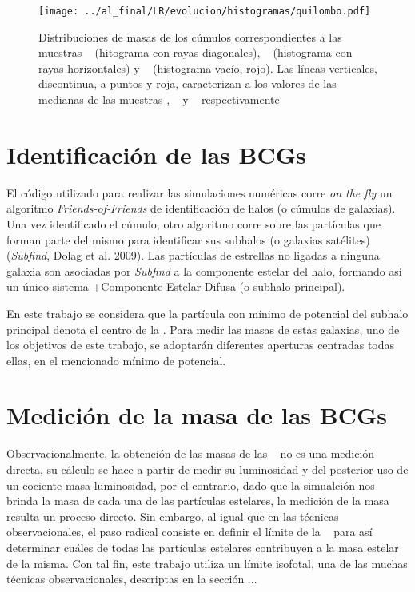 \begin{figure}[H]
 \centering
 \texttt{[image: ../al\_final/LR/evolucion/histogramas/quilombo.pdf]}
 \caption{Distribuciones de masas de los c\'umulos correspondientes a
las muestras \cmay~ (hitograma con rayas diagonales), \cmen~ (histograma con rayas horizontales) y
\aum~ (histograma vac\'io, rojo). Las l\'ineas verticales, discontinua, a puntos y roja, caracterizan a
los valores de las medianas de las muestras \cmay, \cmen~ y \aum~ respectivamente}
\label{fig:distribuciones}
\end{figure}


\section{Identificaci\'on de las BCGs}
El c\'odigo utilizado para realizar las simulaciones num\'ericas corre \textit{on the fly} un algoritmo {\it Friends-of-Friends} 
de identificaci\'on de halos (o c\'umulos de galaxias). Una vez identificado el c\'umulo, otro algoritmo corre sobre las part\'iculas que
forman parte del mismo para identificar sus subhalos (o galaxias sat\'elites) (\textit{Subfind}, Dolag et al. 2009). Las part\'iculas de estrellas no 
ligadas a ninguna galaxia son asociadas por {\it Subfind} a
la componente estelar del halo, formando as\'i un \'unico sistema \bcg+Componente-Estelar-Difusa (o subhalo principal).

En este trabajo se considera que la part\'icula con m\'inimo de potencial del subhalo principal denota el centro de la \bcg.
Para medir las masas de estas galaxias, uno de los objetivos de este trabajo,
se adoptar\'an diferentes aperturas centradas todas ellas, en el mencionado m\'inimo de potencial. 

\section{Medici\'on de la masa de las BCGs}
Observacionalmente, la obtenci\'on de las masas de las \bcgs~ no es una medici\'on directa, su c\'alculo se hace a
partir de medir su luminosidad y del posterior uso de un cociente masa-luminosidad, por el contrario, dado que la simualci\'on
nos brinda la masa de cada una de las part\'iculas estelares, la medici\'on de la masa resulta un proceso directo. Sin embargo, al igual 
que en las t\'ecnicas observacionales, el paso radical consiste en definir el l\'imite de la \bcg~ para as\'i
determinar cu\'ales de todas las part\'iculas estelares contribuyen a la masa estelar de la misma. Con tal fin,
este trabajo utiliza un l\'imite isofotal, una de las muchas t\'ecnicas observacionales, descriptas en la secci\'on ...



